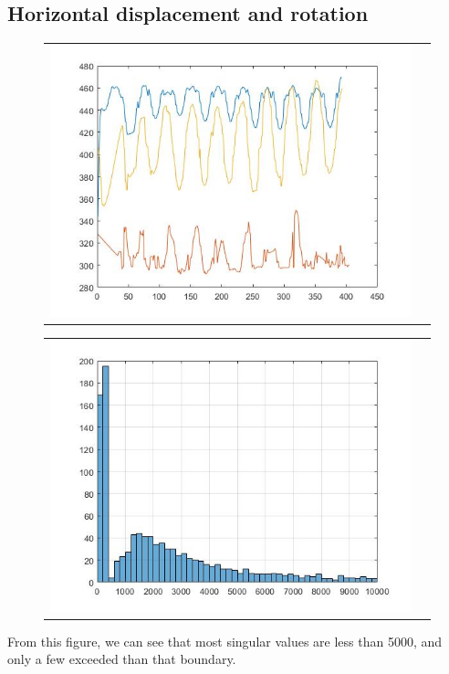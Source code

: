 \documentclass[12pt]{article}
\begin{document}
\subsection{ Horizontal displacement and rotation}
\begin{figure}[H]
\begin{tabular}{cc}
  \includegraphics[width=\textwidth]{N_4.jpg}
\end{tabular}
\end{figure}
\begin{figure}[H]
\begin{tabular}{cc}
  \includegraphics[width=\textwidth]{N_4_variance.jpg}
\end{tabular}
\end{figure}
From this figure, we can see that most singular values are less than 5000, and only a few exceeded than that boundary.
\end{document}
